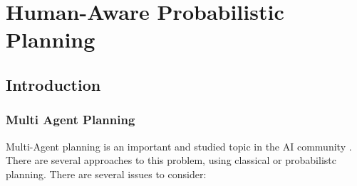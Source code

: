 \chapter{Human-Aware Probabilistic Planning}
\label{subsec:plan_management-happ}



\section{Introduction}

\subsection{Multi Agent Planning}
Multi-Agent planning   is an important and studied topic in the AI community \cite{durfee1999survey}. There are several approaches to this problem, using classical or probabilistc planning. There are several issues to consider:
